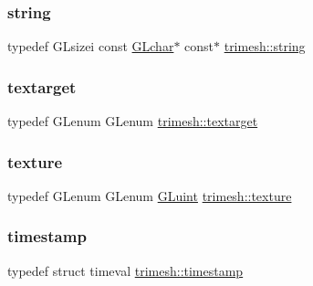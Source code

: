 \mbox{\label{namespacetrimesh_a51b4a31323874089623d4b17afabc1aa}} 
\subsubsection{\texorpdfstring{string}{string}}
{\footnotesize\ttfamily typedef G\+Lsizei const \hyperlink{namespacetrimesh_ae0c0512592dbcadf9b11efef0409d165}{G\+Lchar}$\ast$ const$\ast$ \hyperlink{namespacetrimesh_a51b4a31323874089623d4b17afabc1aa}{trimesh\+::string}}

\mbox{\label{namespacetrimesh_af18b54823c03fa8b2b00f98bfbe214c4}} 
\subsubsection{\texorpdfstring{textarget}{textarget}}
{\footnotesize\ttfamily typedef G\+Lenum G\+Lenum \hyperlink{namespacetrimesh_af18b54823c03fa8b2b00f98bfbe214c4}{trimesh\+::textarget}}

\mbox{\label{namespacetrimesh_a52cc6edbb725def35d45d825de68a091}} 
\subsubsection{\texorpdfstring{texture}{texture}}
{\footnotesize\ttfamily typedef G\+Lenum G\+Lenum \hyperlink{namespacetrimesh_ad2289423ef47b393854afc30451d433b}{G\+Luint} \hyperlink{namespacetrimesh_a52cc6edbb725def35d45d825de68a091}{trimesh\+::texture}}

\mbox{\label{namespacetrimesh_afc360812cb91ca27ac234664b59fe356}} 
\subsubsection{\texorpdfstring{timestamp}{timestamp}}
{\footnotesize\ttfamily typedef struct timeval \hyperlink{namespacetrimesh_afc360812cb91ca27ac234664b59fe356}{trimesh\+::timestamp}}

\mbox{\label{namespacetrimesh_af31d9992cd459bbcf8e2705cb9b541f4}} 
